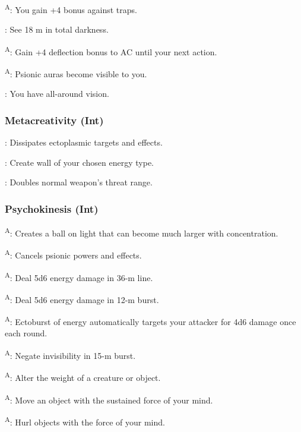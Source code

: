 \textsuperscript{A}: You gain +4 bonus against traps.

: See 18 m in total darkness.

\textsuperscript{A}: Gain +4 deflection bonus to AC until your next action.

\textsuperscript{A}: Psionic auras become visible to you.

: You have all-around vision.


\subsubsection{Metacreativity (Int)}

: Dissipates ectoplasmic targets and effects.

: Create wall of your chosen energy type.

: Doubles normal weapon's threat range.


\subsubsection{Psychokinesis (Int)}

\textsuperscript{A}: Creates a ball on light that can become much larger with concentration.

\textsuperscript{A}: Cancels psionic powers and effects.

\textsuperscript{A}: Deal 5d6 energy damage in 36-m line.

\textsuperscript{A}: Deal 5d6 energy damage in 12-m burst.

\textsuperscript{A}: Ectoburst of energy automatically targets your attacker for 4d6 damage once each round.

\textsuperscript{A}: Negate invisibility in 15-m burst.

\textsuperscript{A}: Alter the weight of a creature or object.

\textsuperscript{A}: Move an object with the sustained force of your mind.

\textsuperscript{A}: Hurl objects with the force of your mind.



